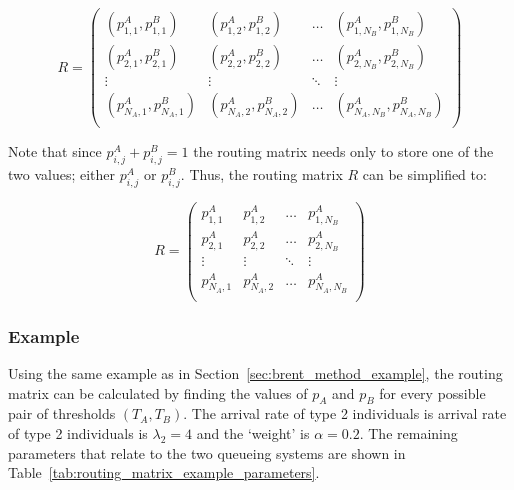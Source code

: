 \begin{equation}\label{eq:routing_matrix}
    R =
    \begin{pmatrix}
        (p_{1,1}^A, p_{1,1}^B) & (p_{1,2}^A, p_{1,2}^B) & \dots &
        (p_{1,N_B}^A, p_{1,N_B}^B) \\
        (p_{2,1}^A, p_{2,1}^B) & (p_{2,2}^A, p_{2,2}^B) & \dots &
        (p_{2,N_B}^A, p_{2,N_B}^B) \\
        \vdots & \vdots & \ddots & \vdots \\
        (p_{N_A,1}^A, p_{N_A,1}^B) & (p_{N_A,2}^A, p_{N_A,2}^B) & \dots &
        (p_{N_A,N_B}^A, p_{N_A,N_B}^B) \\
    \end{pmatrix}
\end{equation}

Note that since \(p_{i,j}^A + p_{i,j}^B = 1\) the routing matrix needs only to
store one of the two values; either \(p_{i,j}^A\) or \(p_{i,j}^B\).
Thus, the routing matrix \(R\) can be simplified to:

\begin{equation}\label{eq:routing_matrix_simplified}
    R =
    \begin{pmatrix}
        p_{1,1}^A & p_{1,2}^A & \dots & p_{1,N_B}^A \\
        p_{2,1}^A & p_{2,2}^A & \dots & p_{2,N_B}^A \\
        \vdots & \vdots & \ddots & \vdots \\
        p_{N_A,1}^A & p_{N_A,2}^A & \dots & p_{N_A,N_B}^A \\
    \end{pmatrix}
\end{equation}


\subsubsection{Example}\label{sec:routing_matrix_example}
Using the same example as in Section~\ref{sec:brent_method_example}, the routing
matrix can be calculated by finding the values of \(p_A\) and \(p_B\) for every
possible pair of thresholds \((T_A, T_B)\).
The arrival rate of type 2 individuals is arrival rate of type 2 individuals is
\(\lambda_2 = 4\) and the `weight' is \(\alpha = 0.2\).
The remaining parameters that relate to the two queueing systems are shown
in Table~\ref{tab:routing_matrix_example_parameters}.

